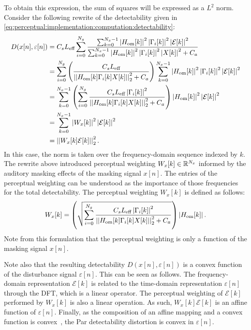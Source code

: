 To obtain this expression, the sum of squares will be expressed as a $L^2$ norm.
Consider the following rewrite of the detectability given in 
\autoref{eq:perceptual:implementation:computation:detectability}: 
\begin{align*}
    D(x[n],\varepsilon[n]) &= C_s L_\text{eff}\sum_{i=0}^{N_g}
                        \frac{\sum_{k=0}^{N_x-1}\left|H_\text{om}[k]\right|^2\left|
                            \Gamma_i[k]\right|^2\left|\mathcal{E}[k]\right|^2}
                        {\sum_{k=0}^{N_x-1}\left|H_\text{om}[k]\right|^2\left|
                            \Gamma_i[k]\right|^2\left|X[k]\right|^2 + C_a} \\
                           &= \sum_{i=0}^{N_g}
                           \left(\frac{C_s L_\text{eff}}{\norm[2][2]{H_\text{om}[k]\Gamma_i[k]X[k]} + C_a}\right)
                        \sum_{k=0}^{N_x-1}\left|H_\text{om}[k]\right|^2\left|
                        \Gamma_i[k]\right|^2\left|\mathcal{E}[k]\right|^2 \\
                           &= \sum_{k=0}^{N_x-1}\left(\sum_{i=0}^{N_g}
                            \frac{C_s L_\text{eff}\left|\Gamma_i[k]\right|^2}
                                 {\norm[2][2]{H_\text{om}[k]\Gamma_i[k]X[k]} + C_a}\right)
                        \left|H_\text{om}[k]\right|^2\left|\mathcal{E}[k]\right|^2 \\
                           &= \sum_{k=0}^{N_x-1}\left|W_x[k]\right|^2\left|\mathcal{E}[k]\right|^2 \\
                           &= \norm[2][2]{W_x[k]\mathcal{E}[k]}. 
\end{align*}
In this case, the norm is taken over the frequency-domain sequence indexed by $k$.
The rewrite above introduced perceptual weighting $W_x[k]\in\mathbb{R}^{N_x}$ informed by the auditory masking effects of the masking signal $x[n]$. 
The entries of the perceptual weighting can be understood as the importance of those frequencies for the total detectability.
The perceptual weighting $W_x[k]$ is defined as follows: 
\begin{equation}
    W_x[k] = \left(\sqrt{\sum_{i=0}^{N_g}\frac{C_s L_\text{eff}\left|\Gamma_i[k]\right|^2}
        {\norm[2][2]{H_\text{om}[k]\Gamma_i[k]X[k]} + C_a}}\right)
        \left|H_\text{om}[k]\right|.
\end{equation}
Note from this formulation that the perceptual weighting is only a function of the masking signal $x[n]$.

Note also that the resulting detectability $D(x[n],\varepsilon[n])$ is a convex function 
of the disturbance signal $\varepsilon[n]$. 
This can be seen as follows.
The frequency-domain representation $\mathcal{E}[k]$ is related to the 
time-domain representation $\varepsilon[n]$ through the DFT, which is a linear operator.
The perceptual weighting of $\mathcal{E}[k]$ performed by $W_x[k]$ is also a linear operation.
As such, $W_x[k]\mathcal{E}[k]$ is an affine function of $\varepsilon[n]$.
Finally, as the composition of an affine mapping and a convex function is convex~\cite{boyd2004convex},
the Par detectability distortion
is convex in $\varepsilon[n]$.

